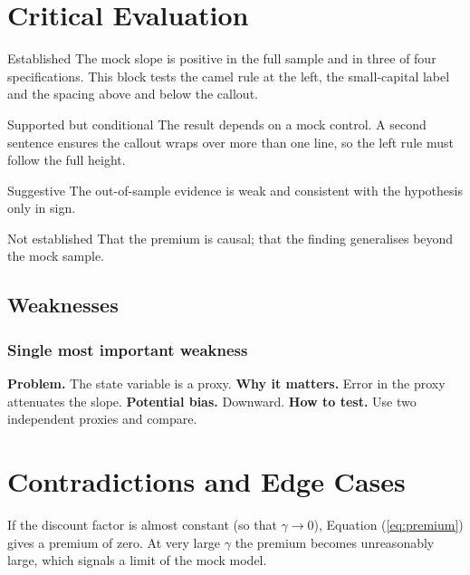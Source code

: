 \documentclass{lrreview}
\begin{document}
\section{Critical Evaluation}

\begin{lrfinding}{Established}
The mock slope is positive in the full sample and in three of four specifications.
This block tests the camel rule at the left, the small-capital label and the
spacing above and below the callout.
\end{lrfinding}

\begin{lrfinding}{Supported but conditional}
The result depends on a mock control. A second sentence ensures the callout wraps
over more than one line, so the left rule must follow the full height.
\end{lrfinding}

\begin{lrfinding}{Suggestive}
The out-of-sample evidence is weak and consistent with the hypothesis only in sign.
\end{lrfinding}

\begin{lrfinding}{Not established}
That the premium is causal; that the finding generalises beyond the mock sample.
\end{lrfinding}

\subsection{Weaknesses}
\subsubsection{Single most important weakness}
\textbf{Problem.} The state variable is a proxy. \textbf{Why it matters.} Error in the
proxy attenuates the slope. \textbf{Potential bias.} Downward. \textbf{How to test.}
Use two independent proxies and compare.

\section{Contradictions and Edge Cases}
 If the discount factor is almost constant (so that $\gamma \to 0$), Equation
(\ref{eq:premium}) gives a premium of zero. At very large $\gamma$ the premium
becomes unreasonably large, which signals a limit of the mock model.
\end{document}
